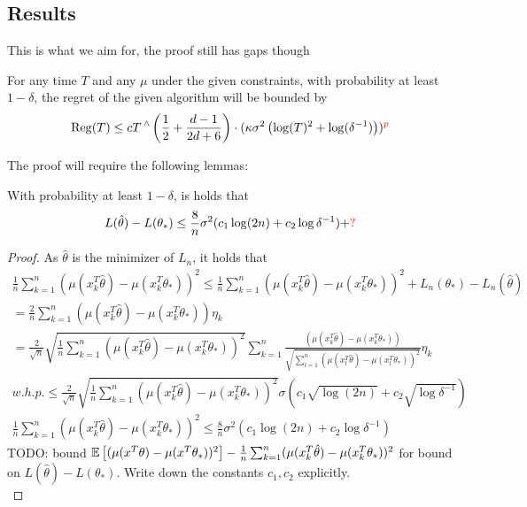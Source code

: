 \subsection{Results}
\color{red}This is what we aim for, the proof still has gaps though\color{black}
\begin{theorem}
    For any time $T$ and any $\mu$ under the given constraints, with probability at least $1-\delta$, the regret of the given algorithm will be bounded by
    \begin{align}
        \operatorname{Reg}(T) \leq c T\caret\left(\frac{1}{2}+\frac{d-1}{2d+6}\right)\cdot(\kappa\sigma^2\left(\log(T)^2+\log(\delta^{-1})\right))\color{red}^p\color{black}
    \end{align}
\end{theorem}
The proof will require the following lemmas:
\begin{lemma}
    With probability at least $1-\delta$, is holds that 
    \begin{align}
    L(\hat{\theta})-L(\theta_*)\leq \frac{8}{n}\sigma^2(c_1\log(2n)+c_2\log{\delta^{-1}})+\color{red}?\color{black}
    \end{align}
\end{lemma}
\begin{proof}
    As $\hat{\theta}$ is the minimizer of $L_n$, it holds that
    \begin{align*}
        \frac{1}{n}\sum_{k=1}^n(\mu(x_k^T\hat{\theta})-\mu(x_k^T\theta_*))^2 \leq \frac{1}{n}\sum_{k=1}^n(\mu(x_k^T\hat{\theta})-\mu(x_k^T\theta_*))^2 + L_n(\theta_*)-L_n(\hat{\theta})\\
        = \frac{2}{n}\sum_{k=1}^n(\mu(x_k^T\hat{\theta})-\mu(x_k^T\theta_*))\eta_k\\
        = \frac{2}{\sqrt{n}}\sqrt{\frac{1}{n}\sum_{k=1}^n(\mu(x_k^T\hat{\theta})-\mu(x_k^T\theta_*))^2}\sum_{k=1}^n\frac{(\mu(x_k^T\hat{\theta})-\mu(x_k^T\theta_*))}{\sqrt{\sum_{l=1}^n(\mu(x_l^T\hat{\theta})-\mu(x_l^T\theta_*))^2}}\eta_k\\
        w.h.p. \leq   \frac{2}{\sqrt{n}}\sqrt{ \frac{1}{n}\sum_{k=1}^n(\mu(x_k^T\hat{\theta})-\mu(x_k^T\theta_*))^2 }\sigma(c_1\sqrt{\log(2n)}+c_2\sqrt{\log{\delta^{-1}}})\\
        \frac{1}{n}\sum_{k=1}^n(\mu(x_k^T\hat{\theta})-\mu(x_k^T\theta_*))^2 \leq \frac{8}{n}\sigma^2(c_1\log(2n)+c_2\log{\delta^{-1}})
    \end{align*}
    \color{red}TODO: bound $\mathbb{E}\left[(\mu(x^T\theta)-\mu(x^T\theta_*))^2\right]-\frac{1}{n}\sum_{k=1}^n(\mu(x_k^T\hat{\theta})-\mu(x_k^T\theta_*))^2$ for bound on $L(\hat{\theta})-L(\theta_*)$. Write down the constants $c_1, c_2$ explicitly.\color{black}\\
\end{proof}
